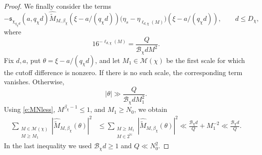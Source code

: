 \documentclass[12pt,reqno]{amsart}
\numberwithin{equation}{section}
\theoremstyle{definition}
\theoremstyle{remark}
\begin{document}
\begin{proof}
We finally consider the terms
\[
 -\mathfrak s_{\chi_{q_\chi d}}(a,q_\chi d)
 \widehat{\widetilde M}_{M,\beta_\chi}
       (\xi-a/(q_\chi d))
 \bigl(\eta_s-\eta_{\ell_{d,\chi}(M)}\bigr)
       (\xi-a/(q_\chi d)),
 \qquad d\leq D_\chi,
\]
where
\[
 16^{-\ell_{d,\chi}(M)}
 =\frac{Q}{\mathcal B_\chi dM^2}.
\]
Fix \(d,a\), put \(\theta=\xi-a/(q_\chi d)\), and let
\(M_1\in\mathcal M(\chi)\) be the first scale for which the cutoff
difference is nonzero.  If there is no such scale, the corresponding
term vanishes.  Otherwise,
\[
 |\theta|\gg\frac{Q}{\mathcal B_\chi dM_1^2}.
\]
Using \eqref{e:MNless}, \(M^{\beta_\chi-1}\leq1\), and
\(M_1\geq N_0\), we obtain
\begin{align*}
 \sum_{\substack{M\in\mathcal M(\chi)\\M\geq M_1}}
 |\widehat{\widetilde M}_{M,\beta_\chi}(\theta)|^2
 &\leq
 \sum_{\substack{M\geq M_1\\M\in2^{\mathbb N}}}
 |\widehat{\widetilde M}_{M,\beta_\chi}(\theta)|^2\ll
 \frac{\mathcal B_\chi d}{Q}+M_1^{-2}
 \ll\frac{\mathcal B_\chi d}{Q}.
\end{align*}
In the last inequality we used
\(\mathcal B_\chi d\geq1\) and \(Q\ll N_0^2\).


\end{proof}
\end{document}

